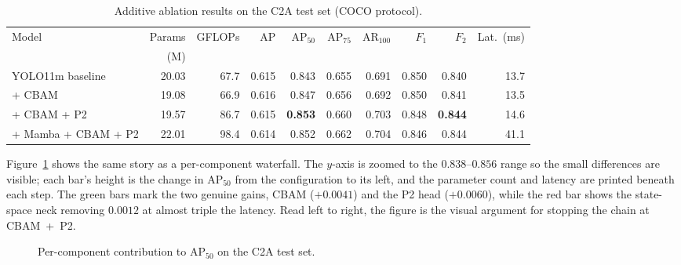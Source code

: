 \begin{table}[H]
  \centering
  \caption{Additive ablation results on the C2A test set (COCO protocol).}
  \label{tab:main}
  \small
  \setlength{\tabcolsep}{3pt}
  \begin{tabular}{@{}l r r r r r r r r r@{}}
    \toprule
    Model & Params & GFLOPs & AP & $\mathrm{AP}_{50}$ & $\mathrm{AP}_{75}$ & $\mathrm{AR}_{100}$ & $F_1$ & $F_2$ & Lat.\ (ms) \\
    & (M) & & & & & & & & \\
    \midrule
    YOLO11m baseline    & 20.03 & 67.7 & 0.615 & 0.843 & 0.655 & 0.691 & 0.850 & 0.840 & 13.7 \\
    + CBAM              & 19.08 & 66.9 & 0.616 & 0.847 & 0.656 & 0.692 & 0.850 & 0.841 & 13.5 \\
    + CBAM + P2         & 19.57 & 86.7 & 0.615 & \textbf{0.853} & 0.660 & 0.703 & 0.848 & \textbf{0.844} & 14.6 \\
    + Mamba + CBAM + P2 & 22.01 & 98.4 & 0.614 & 0.852 & 0.662 & 0.704 & 0.846 & 0.844 & 41.1 \\
    \bottomrule
  \end{tabular}
\end{table}

Figure~\ref{fig:waterfall} shows the same story as a per-component waterfall.
The $y$-axis is zoomed to the $0.838$--$0.856$ range so the small differences
are visible; each bar's height is the change in $\mathrm{AP}_{50}$ from the
configuration to its left, and the parameter count and latency are printed
beneath each step. The green bars mark the two genuine gains, CBAM
($+0.0041$) and the P2 head ($+0.0060$), while the red bar shows the
state-space neck removing $0.0012$ at almost triple the latency. Read left to
right, the figure is the visual argument for stopping the chain at
CBAM~+~P2.

\begin{figure}[H]
  \centering
  
  \caption{Per-component contribution to $\mathrm{AP}_{50}$ on the C2A test set.}
  \label{fig:waterfall}
\end{figure}

